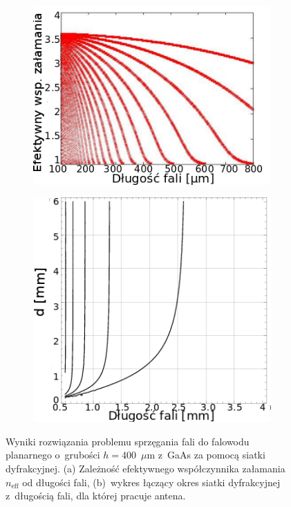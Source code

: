 \begin{figure}
\begin{subfigure}{0.5\textwidth}
        \includegraphics[width=\textwidth]{images/thz/gaas-neffeps.png}
	\caption{}
	\label{fig:gaas-effn}
\end{subfigure}
\begin{subfigure}{0.5\textwidth}
        \includegraphics[width=\textwidth]{images/antenaThz/d_lambda.png}
	\caption{}
	\label{fig:d-lusok}
\end{subfigure}
\caption{Wyniki rozwiązania problemu sprzęgania fali do falowodu planarnego o~grubości $h=$400~$\mu$m z~GaAs za pomocą siatki dyfrakcyjnej.  (a) Zależność efektywnego współczynnika załamania $n_{\textrm{eff}}$ od długości fali, (b)~wykres łączący okres siatki dyfrakcyjnej z~długością fali, dla której pracuje antena. }
\end{figure}

